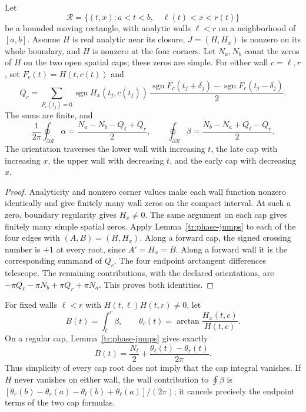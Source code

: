 \begin{proposition}\label{tr:boundary-count}
Let
\[
 \mathcal R=\{(t,x):a<t<b,\quad \ell(t)<x<r(t)\}
\]
be a bounded moving rectangle, with analytic walls $\ell<r$ on a
neighborhood of $[a,b]$.  Assume $H$ is real analytic near its closure,
$J=(H,H_x)$ is nonzero on its whole boundary, and $H$ is nonzero at the
four corners.  Let $N_a,N_b$ count the zeros of $H$ on the two open
spatial caps; these zeros are simple.  For either wall $c=\ell,r$, set
$F_c(t)=H(t,c(t))$ and
\begin{equation}\label{tr:wall-flux}
 Q_c=\sum_{F_c(t_j)=0}\operatorname{sgn}H_x(t_j,c(t_j))\,
 \frac{\operatorname{sgn}F_c(t_j+\delta_j)
       -\operatorname{sgn}F_c(t_j-\delta_j)}2.
\end{equation}
The sums are finite, and
\begin{equation}\label{tr:count-winding}
 \frac1{2\pi}\oint_{\partial\mathcal R}\alpha
       =\frac{N_a-N_b-Q_\ell+Q_r}{2},\qquad
 \oint_{\partial\mathcal R}\beta
       =\frac{N_b-N_a+Q_\ell-Q_r}{2}.
\end{equation}
The orientation traverses the lower wall with increasing $t$, the late
cap with increasing $x$, the upper wall with decreasing $t$, and the
early cap with decreasing $x$.
\end{proposition}

\begin{proof}
Analyticity and nonzero corner values make each wall function nonzero
identically and give finitely many wall zeros on the compact interval.
At such a zero, boundary regularity gives $H_x\ne0$.  The same argument
on each cap gives finitely many simple spatial zeros.  Apply
Lemma~\ref{tr:phase-jumps} to each of the four edges with
$(A,B)=(H,H_x)$.  Along a forward cap, the signed crossing number is
$+1$ at every root, since $A'=H_x=B$.  Along a forward wall it is the
corresponding summand of $Q_c$.  The four endpoint arctangent
differences telescope.  The remaining contributions, with the declared
orientations, are $-\pi Q_\ell-\pi N_b+\pi Q_r+\pi N_a$.
This proves both identities.
\end{proof}

\begin{remark}\label{tr:cap-roots}
For fixed walls $\ell<r$ with $H(t,\ell)H(t,r)\ne0$, let
\[
 B(t)=\int_\ell^r\beta,
 \qquad\theta_c(t)=\arctan\frac{H_x(t,c)}{H(t,c)}.
\]
On a regular cap, Lemma~\ref{tr:phase-jumps} gives exactly
\begin{equation}\label{tr:single-cap}
 B(t)=\frac{N_t}{2}
                +\frac{\theta_\ell(t)-\theta_r(t)}{2\pi}.
\end{equation}
Thus simplicity of every cap root does not imply that the cap integral
vanishes.  If $H$ never vanishes on either wall, the wall contribution
to $\oint\beta$ is
$[\theta_r(b)-\theta_r(a)-\theta_\ell(b)+\theta_\ell(a)]/(2\pi)$;
it cancels precisely the endpoint terms of the two cap formulas.
\end{remark}

